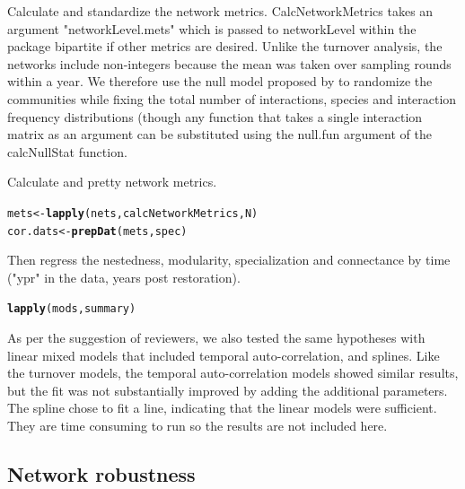 \documentclass{article}\usepackage[]{graphicx}\usepackage[]{color}
\makeatletter
\newcommand{\hlstd}[1]{\textcolor[rgb]{0.345,0.345,0.345}{#1}}%
\newcommand{\hlkwb}[1]{\textcolor[rgb]{0.69,0.353,0.396}{#1}}%
\newcommand{\hlkwd}[1]{\textcolor[rgb]{0.737,0.353,0.396}{\textbf{#1}}}%
\newenvironment{kframe}{%
 \def\at@end@of@kframe{}%
 \ifinner\ifhmode%
  \def\at@end@of@kframe{\end{minipage}}%
  \begin{minipage}{\columnwidth}%
 \fi\fi%
 \def\FrameCommand##1{\hskip\@totalleftmargin \hskip-\fboxsep
 \colorbox{shadecolor}{##1}\hskip-\fboxsep
     \hskip-\linewidth \hskip-\@totalleftmargin \hskip\columnwidth}%
 \MakeFramed {\advance\hsize-\width
   \@totalleftmargin\z@ \linewidth\hsize
   \@setminipage}}%
 {\par\unskip\endMakeFramed%
 \at@end@of@kframe}
\newenvironment{knitrout}{}{} %
\makeatother
\begin{document}
Calculate and standardize the network metrics. CalcNetworkMetrics
takes an argument "networkLevel.mets" which is passed to networkLevel
within the package bipartite \citep{bipartite} if other metrics are
desired. Unlike the turnover analysis, the networks include
non-integers because the mean was taken over sampling rounds within a
year. We therefore use the null model proposed by \citep{Galeano2009}
to randomize the communities while fixing the total number of
interactions, species and interaction frequency distributions (though
any function that takes a single interaction matrix as an argument can
be substituted using the null.fun argument of the calcNullStat
function.

Calculate and pretty network metrics.

\begin{knitrout}
\color{fgcolor}\begin{kframe}
\begin{alltt}
 \hlstd{mets} \hlkwb{<-} \hlkwd{lapply}\hlstd{(nets, calcNetworkMetrics, N)}
 \hlstd{cor.dats} \hlkwb{<-} \hlkwd{prepDat}\hlstd{(mets,  spec)}
\end{alltt}
\end{kframe}
\end{knitrout}


Then regress the nestedness, modularity, specialization and
connectance by time ("ypr" in the data, years post restoration).

\begin{knitrout}
\color{fgcolor}\begin{kframe}
\begin{alltt}
\hlkwd{lapply}\hlstd{(mods, summary)}
\end{alltt}
\end{kframe}
\end{knitrout}

As per the suggestion of reviewers, we also tested the same hypotheses
with linear mixed models that included temporal auto-correlation, and
splines. Like the turnover models, the temporal auto-correlation
models showed similar results, but the fit was not substantially
improved by adding the additional parameters. The spline chose to fit
a line, indicating that the linear models were sufficient. They are
time consuming to run so the results are not included here.

\subsection{Network robustness}
\end{document}
